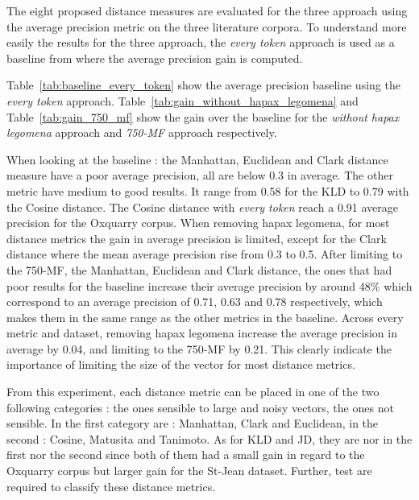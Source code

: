 The eight proposed distance measures are evaluated for the three approach using the average precision metric on the three literature corpora.
To understand more easily the results for the three approach, the \textit{every token} approach is used as a baseline from where the average precision gain is computed.

Table~\ref{tab:baseline_every_token} show the average precision baseline using the \textit{every token} approach.
Table~\ref{tab:gain_without_hapax_legomena} and Table~\ref{tab:gain_750_mf} show the gain over the baseline for the \textit{without hapax legomena} approach and \textit{750-MF} approach respectively.

When looking at the baseline : the Manhattan, Euclidean and Clark distance measure have a poor average precision, all are below 0.3 in average.
The other metric have medium to good results.
It range from 0.58 for the KLD to 0.79 with the Cosine distance.
The Cosine distance with \textit{every token} reach a 0.91 average precision for the Oxquarry corpus.
When removing hapax legomena, for most distance metrics the gain in average precision is limited, except for the Clark distance where the mean average precision rise from 0.3 to 0.5.
After limiting to the 750-MF, the Manhattan, Euclidean and Clark distance, the ones that had poor results for the baseline increase their average precision by around 48\% which correspond to an average precision of 0.71, 0.63 and 0.78 respectively, which makes them in the same range as the other metrics in the baseline.
Across every metric and dataset, removing hapax legomena increase the average precision in average by 0.04, and limiting to the 750-MF by 0.21.
This clearly indicate the importance of limiting the size of the vector for most distance metrics.

From this experiment, each distance metric can be placed in one of the two following categories : the ones sensible to large and noisy vectors, the ones not sensible.
In the first category are : Manhattan, Clark and Euclidean, in the second : Cosine, Matusita and Tanimoto.
As for KLD and JD, they are nor in the first nor the second since both of them had a small gain in regard to the Oxquarry corpus but larger gain for the St-Jean dataset.
Further, test are required to classify these distance metrics.


